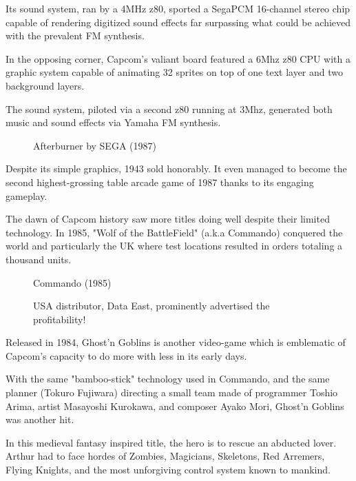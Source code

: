 Its sound system, ran by a 4MHz z80, sported a SegaPCM 16-channel stereo chip capable of rendering digitized sound effects far surpassing what could be achieved with the prevalent FM synthesis.

In the opposing corner, Capcom's valiant board featured a 6Mhz z80 CPU with a graphic system capable of animating 32 sprites on top of one text layer and two background layers\cite{1942-tech_specs}. 

The sound system, piloted via a second z80 running at 3Mhz, generated both music and sound effects via Yamaha FM synthesis.




\begin{figure}[H]
\caption*{Afterburner by SEGA (1987)}
\end{figure}

Despite its simple graphics, 1943 sold honorably. It even managed to become the second highest-grossing table arcade game of 1987 thanks to its engaging gameplay. 

The dawn of Capcom history saw more titles doing well despite their limited technology. In 1985, "Wolf of the BattleField" (a.k.a Commando) conquered the world and particularly the UK where test locations resulted in orders totaling a thousand units\cite{cgm4}.

\begin{figure}[H]
\caption*{Commando (1985)}
\end{figure}


\vfill

\begin{figure}[!b]
\caption*{USA distributor, Data East, prominently advertised the profitability!}
\end{figure}
\pagebreak


Released in 1984, Ghost'n Goblins is another video-game which is emblematic of Capcom's capacity to do more with less in its early days. 

With the same "bamboo-stick" technology used in Commando, and the same planner (Tokuro Fujiwara) directing a small team made of programmer Toshio Arima, artist Masayoshi Kurokawa, and composer Ayako Mori, Ghost'n Goblins was another hit.

In this medieval fantasy inspired title, the hero is to rescue an abducted lover. Arthur had to face hordes of Zombies, Magicians, Skeletons, Red Arremers, Flying Knights, and the most unforgiving control system known to mankind.

